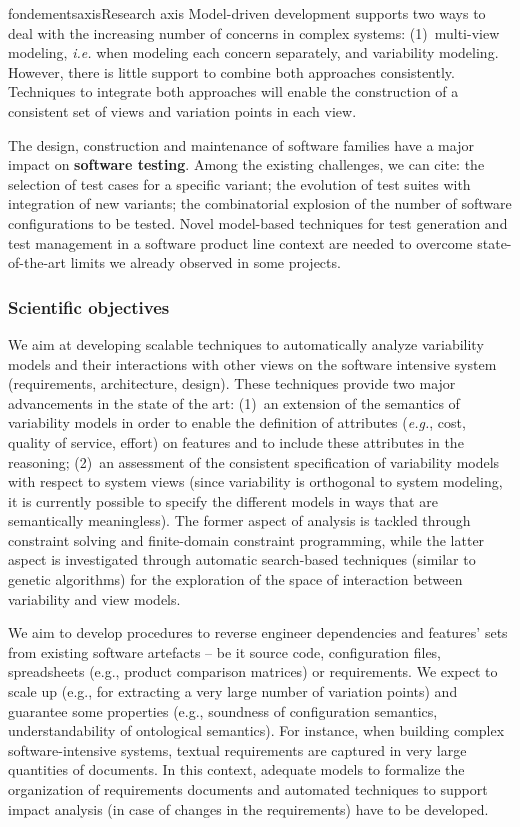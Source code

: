 \documentclass{ra2018}
\begin{document}
\begin{module}{fondements}{axis}{Research axis}
Model-driven development supports two ways to deal with the increasing number of concerns in complex systems: (1)~multi-view modeling, \textit{i.e.} when modeling each concern separately, and variability modeling. However, there is little support to combine both approaches consistently. Techniques to integrate both approaches will enable the construction of a consistent set of views and variation points in each view.

The design, construction and maintenance of software families have a major impact on \textbf{software testing}. Among the existing challenges, we can cite: the selection of test cases for a specific variant; the evolution of test suites with integration of new variants; the combinatorial explosion of the number of software configurations to be tested. Novel model-based techniques for test generation and test management in a software product line context are needed to overcome state-of-the-art limits we already observed in some projects.

\subsubsection*{Scientific objectives} 


We aim at developing scalable  techniques  to automatically analyze variability models and their interactions with other views on the software intensive system (requirements, architecture, design). These techniques  provide two major advancements in the  state of the art: (1)~an extension of the semantics of variability models in order to enable the definition of attributes (\textit{e.g.}, cost, quality of service, effort) on features and to include these attributes in the reasoning;  (2)~an assessment of the consistent specification of variability models with respect to system views (since variability is orthogonal to system modeling, it is currently possible to specify the different models in ways that are semantically meaningless). The former aspect of analysis is tackled through  constraint solving and finite-domain constraint programming, while the latter aspect is investigated through automatic search-based techniques (similar to genetic algorithms) for the exploration of the space of interaction between variability and view models.

We aim to develop procedures to reverse engineer dependencies and features' sets from existing software artefacts -- be it source code, configuration files, spreadsheets (e.g., product comparison matrices) or requirements. 
We expect to scale up (e.g., for extracting a very large number of variation points) and guarantee some properties (e.g., soundness of configuration semantics, understandability of ontological semantics). 
For instance, when building complex software-intensive systems, textual requirements are captured in very large quantities of documents. In this context, adequate models to formalize the organization of requirements documents and automated techniques to support impact analysis (in case of changes in the requirements) have to be developed.


\end{module}
\end{document}
